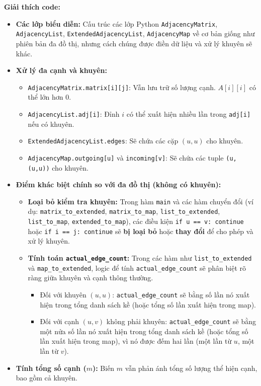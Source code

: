 \documentclass{article}
\begin{document}
\textbf{Giải thích code:}

\begin{itemize}
    \item \textbf{Các lớp biểu diễn:} Cấu trúc các lớp Python \texttt{AdjacencyMatrix}, \texttt{AdjacencyList}, \texttt{ExtendedAdjacencyList}, \texttt{AdjacencyMap} về cơ bản giống như phiên bản đa đồ thị, nhưng cách chúng được điền dữ liệu và xử lý khuyên sẽ khác.
    \item \textbf{Xử lý đa cạnh và khuyên:}
    \begin{itemize}
        \item \texttt{AdjacencyMatrix.matrix[i][j]}: Vẫn lưu trữ số lượng cạnh. $A[i][i]$ có thể lớn hơn 0.
        \item \texttt{AdjacencyList.adj[i]}: Đỉnh $i$ có thể xuất hiện nhiều lần trong \texttt{adj[i]} nếu có khuyên.
        \item \texttt{ExtendedAdjacencyList.edges}: Sẽ chứa các cặp $(u,u)$ cho khuyên.
        \item \texttt{AdjacencyMap.outgoing[u]} và \texttt{incoming[v]}: Sẽ chứa các tuple \texttt{(u, (u,u))} cho khuyên.
    \end{itemize}
    \item \textbf{Điểm khác biệt chính so với đa đồ thị (không có khuyên):}
    \begin{itemize}
        \item \textbf{Loại bỏ kiểm tra khuyên:} Trong hàm \texttt{main} và các hàm chuyển đổi (ví dụ: \texttt{matrix\_to\_extended}, \texttt{matrix\_to\_map}, \texttt{list\_to\_extended}, \texttt{list\_to\_map}, \texttt{extended\_to\_map}), các điều kiện \texttt{if u == v: continue} hoặc \texttt{if i == j: continue} sẽ \textbf{bị loại bỏ} hoặc \textbf{thay đổi} để cho phép và xử lý khuyên.
        \item \textbf{Tính toán \texttt{actual\_edge\_count}:} Trong các hàm như \texttt{list\_to\_extended} và \texttt{map\_to\_extended}, logic để tính \texttt{actual\_edge\_count} sẽ phân biệt rõ ràng giữa khuyên và cạnh thông thường.
        \begin{itemize}
            \item Đối với khuyên $(u,u)$: \texttt{actual\_edge\_count} sẽ bằng số lần nó xuất hiện trong tổng danh sách kề (hoặc tổng số lần xuất hiện trong map).
            \item Đối với cạnh $(u,v)$ không phải khuyên: \texttt{actual\_edge\_count} sẽ bằng một nửa số lần nó xuất hiện trong tổng danh sách kề (hoặc tổng số lần xuất hiện trong map), vì nó được đếm hai lần (một lần từ $u$, một lần từ $v$).
        \end{itemize}
    \end{itemize}
    \item \textbf{Tính tổng số cạnh ($m$):} Biến $m$ vẫn phản ánh tổng số lượng thể hiện cạnh, bao gồm cả khuyên.
\end{itemize}
\end{document}

